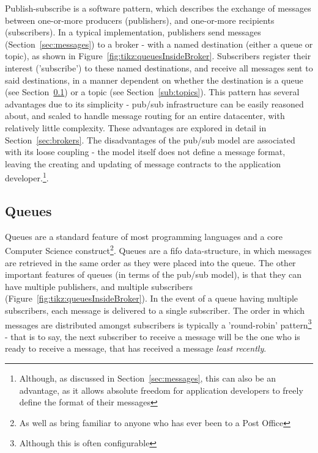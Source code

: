 Publish-subscribe is a software pattern, which describes the exchange of
messages between one-or-more producers (publishers), and one-or-more recipients
(subscribers). In a typical implementation, publishers send messages
(Section~\ref{sec:messages}) to a broker - with a named destination (either a
queue or topic), as shown in Figure~\ref{fig:tikz:queuesInsideBroker}.
Subscribers register their interest ('subscribe') to these named destinations,
and receive all messages sent to said destinations, in a manner dependent on
whether the destination is a queue (see Section~\ref{sub:queues}) or a topic
(see Section~\ref{sub:topics}). This pattern has several advantages due to its
simplicity - pub/sub infrastructure can be easily reasoned about, and scaled to
handle message routing for an entire datacenter, with relatively little
complexity. These advantages are explored in detail in
Section~\ref{sec:brokers}. The disadvantages of the pub/sub model are associated
with its loose coupling - the model itself does not define a message format,
leaving the creating and updating of message contracts to the application
developer.\footnote{Although, as discussed in Section~\ref{sec:messages}, this
can also be an advantage, as it allows absolute freedom for application
developers to freely define the format of their messages}.

\subsection{Queues}
\label{sub:queues}

Queues are a standard feature of most programming languages and a core Computer
Science construct\footnote{As well as bring familiar to anyone who has ever been
to a Post Office}. Queues are a \gls{fifo} data-structure, in which messages are
retrieved in the same order as they were placed into the queue. The other
important features of queues (in terms of the pub/sub model), is that they can
have multiple publishers, and multiple subscribers
(Figure~\ref{fig:tikz:queuesInsideBroker}). In the event of a queue having
multiple subscribers, each message is delivered to a single subscriber. The
order in which messages are distributed amongst subscribers is typically a
'round-robin' pattern\footnote{Although this is often configurable} - that is to
say, the next subscriber to receive a message will be the one who is ready to
receive a message, that has received a message \emph{least recently}.

